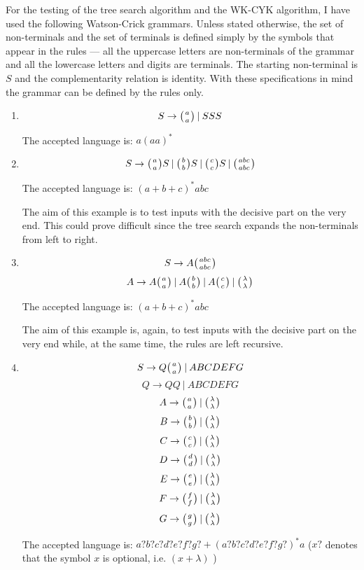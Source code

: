 For the testing of the tree search algorithm and the WK-CYK algorithm, I have used the following Watson-Crick grammars. Unless stated otherwise, the set of non-terminals and the set of terminals is defined simply by the symbols that appear in the rules --- all the uppercase letters are non-terminals of the grammar and all the lowercase letters and digits are terminals. The starting non-terminal is $S$ and the complementarity relation is identity. With these specifications in mind the grammar can be defined by the rules only.

\begin{enumerate}
  \item{
    $$S \rightarrow \wkpair{a}{a} \:|\: S S S$$

    The accepted language is: $a(aa)^*$
  }

  \item{
    $$S \rightarrow \wkpair{a}{a} S \:|\: \wkpair{b}{b} S \:|\: \wkpair{c}{c} S \:|\: \wkpair{abc}{abc}$$

    The accepted language is: $(a+b+c)^*abc$

    The aim of this example is to test inputs with the decisive part on the very end. This could prove difficult  since the tree search expands the non-terminals from left to right.
  }

  \item{
    $$S \rightarrow A \wkpair{abc}{abc}$$
    $$A \rightarrow A \wkpair{a}{a} \:|\: A \wkpair{b}{b} \:|\: A \wkpair{c}{c} \:|\: \wkpair{\lambda}{\lambda}$$

    The accepted language is: $(a+b+c)^*abc$

    The aim of this example is, again, to test inputs with the decisive part on the very end while, at the same time, the rules are left recursive.
  }

  \item{
    $$S \rightarrow Q \wkpair{a}{a} \:|\: A B C D E F G$$
    $$Q \rightarrow Q Q \:|\: A B C D E F G$$
    $$A \rightarrow \wkpair{a}{a} \:|\: \wkpair{\lambda}{\lambda}$$
    $$B \rightarrow \wkpair{b}{b} \:|\: \wkpair{\lambda}{\lambda}$$
    $$C \rightarrow \wkpair{c}{c} \:|\: \wkpair{\lambda}{\lambda}$$
    $$D \rightarrow \wkpair{d}{d} \:|\: \wkpair{\lambda}{\lambda}$$
    $$E \rightarrow \wkpair{e}{e} \:|\: \wkpair{\lambda}{\lambda}$$
    $$F \rightarrow \wkpair{f}{f} \:|\: \wkpair{\lambda}{\lambda}$$
    $$G \rightarrow \wkpair{g}{g} \:|\: \wkpair{\lambda}{\lambda}$$

    The accepted language is: $a?b?c?d?e?f?g? + (a?b?c?d?e?f?g?)^*a$ ($x?$ denotes that the symbol $x$ is optional, i.e. $(x + \lambda)$ )

}
\end{enumerate}
